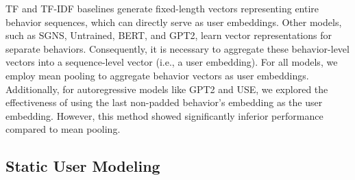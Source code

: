 \documentclass{article}
\begin{document}

TF and TF-IDF baselines generate fixed-length vectors representing entire behavior sequences, which can directly serve as user embeddings. Other models, such as SGNS, Untrained, BERT, and GPT2, learn vector representations for separate behaviors. Consequently, it is necessary to aggregate these behavior-level vectors into a sequence-level vector (i.e., a user embedding). For all models, we employ mean pooling to aggregate behavior vectors as user embeddings. Additionally, for autoregressive models like GPT2 and USE, we explored the effectiveness of using the last non-padded behavior's embedding as the user embedding. However, this method showed significantly inferior performance compared to mean pooling.

\subsection{Static User Modeling}
\end{document}
